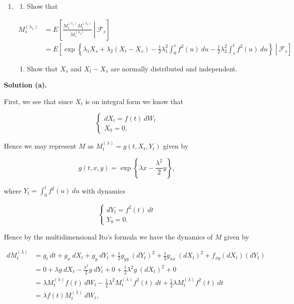 \documentclass[
]{book}
\providecommand{\tightlist}{%
  \setlength{\itemsep}{0pt}\setlength{\parskip}{0pt}}
\begin{document}
\begin{enumerate}
\def\labelenumi{\alph{enumi}.}
\setcounter{enumi}{1}
\item
  \begin{enumerate}
  \def\labelenumii{\roman{enumii}.}
  \tightlist
  \item
    Show that
  \end{enumerate}

  \begin{align*}
  M^{(\lambda_1)}_s&=E\left[\left.\frac{M^{(\lambda_1)}_sM^{(\lambda_2)}_t}{M^{(\lambda_2)}_s} \ \right\vert\ \mathcal{F}_s\right]\\
  &=E\left[\left.\exp\left\{\lambda_1X_s+\lambda_2(X_t-X_s)-\frac{1}{2}\lambda_1^2\int_0^sf^2(u)\ du- \frac{1}{2}\lambda_2^2\int_s^tf^2(u)\ du\right\} \ \right\vert\ \mathcal{F}_s\right]
  \end{align*}

  \begin{enumerate}
  \def\labelenumii{\roman{enumii}.}
  \setcounter{enumii}{1}
  \tightlist
  \item
    Show that \(X_s\) and \(X_t-X_s\) are normally distributed and independent.
  \end{enumerate}
\end{enumerate}

\textbf{Solution (a).}

First, we see that since \(X_t\) is on integral form we know that

\[
\begin{cases}
dX_t=f(t)\ dW_t\\
X_0=0.
\end{cases}
\]

Hence we may represent \(M\) as \(M^{(\lambda)}_t=g(t,X_t,Y_t)\) given by

\[
g(t,x,y)=\exp\left\{\lambda x-\frac{\lambda^2}{2}y \right\},
\]

where \(Y_t=\int_0^t f^2(u)\ du\) with dynamics

\[
\begin{cases}
dY_t=f^2(t)\ dt\\
Y_0=0.
\end{cases}
\]

Hence by the multidimensional Ito's formula we have the dynamics of \(M\) given by

\begin{align*}
dM^{(\lambda)}_t&=g_t\ dt+g_x\ dX_t+g_y\ dY_t+\frac{1}{2}g_{yy}\ (dY_t)^2+\frac{1}{2}g_{xx}\ (dX_t)^2 +f_{xy}(dX_t)(dY_t)\\
&=0+\lambda g\ dX_t-\frac{\lambda^2}{2}g\ dY_t+0+\frac{1}{2}\lambda ^2g\ (dX_t)^2+0\\
&=\lambda M_t^{(\lambda)} f(t)\ dW_t-\frac{1}{2}\lambda^2M_t^{(\lambda)} f^2(t)\ dt+\frac{1}{2}\lambda M_t^{(\lambda)} f^2(t)\ dt\\
&=\lambda f(t)M_t^{(\lambda)}\ dW_t,
\end{align*}
\end{document}
